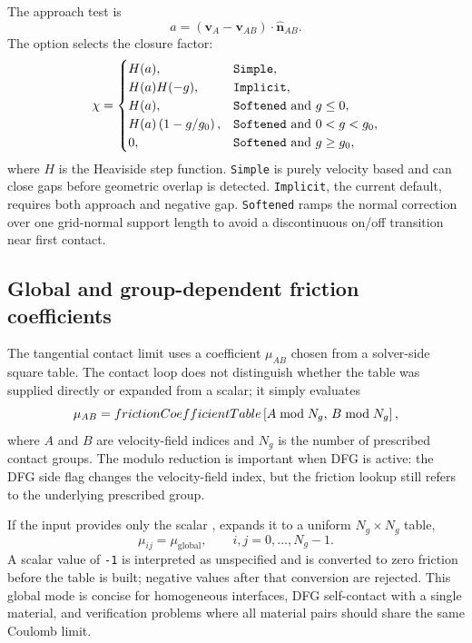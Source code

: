 The approach test is
\begin{equation}
  a=(\mathbf{v}_A-\mathbf{v}_{AB})\cdot\hat{\mathbf{n}}_{AB}.
\end{equation}
The  option selects the closure factor:
\begin{equation}
\chi =
\begin{cases}
  H(a), & \texttt{Simple},\\
  H(a)H(-g), & \texttt{Implicit},\\
  H(a), & \texttt{Softened}\ \hbox{and}\ g\le 0,\\
  H(a)\left(1-g/g_0\right), & \texttt{Softened}\ \hbox{and}\ 0<g<g_0,\\
  0, & \texttt{Softened}\ \hbox{and}\ g\ge g_0,
\end{cases}
\label{eq:contact-gap-closure-factor}
\end{equation}
where $H$ is the Heaviside step function.  \texttt{Simple} is purely velocity based and can close gaps before geometric overlap is detected.  \texttt{Implicit}, the current default, requires both approach and negative gap.  \texttt{Softened} ramps the normal correction over one grid-normal support length to avoid a discontinuous on/off transition near first contact.

\subsection{Global and group-dependent friction coefficients}
\label{subsec:contact-friction-coefficients}

The tangential contact limit uses a coefficient $\mu_{AB}$ chosen from a solver-side square table.  The contact loop does not distinguish whether the table was supplied directly or expanded from a scalar; it simply evaluates
\begin{equation}
  \mu_{AB}=frictionCoefficientTable
  \left[A\bmod N_g,\,B\bmod N_g\right],
  \label{eq:contact-friction-table-index}
\end{equation}
where $A$ and $B$ are velocity-field indices and $N_g$ is the number of prescribed contact groups.  The modulo reduction is important when DFG is active: the DFG side flag changes the velocity-field index, but the friction lookup still refers to the underlying prescribed group.

If the input provides only the scalar ,  expands it to a uniform $N_g\times N_g$ table,
\begin{equation}
  \mu_{ij}=\mu_{\mathrm{global}},\qquad i,j=0,\ldots,N_g-1.
\end{equation}
A scalar value of \texttt{-1} is interpreted as unspecified and is converted to zero friction before the table is built; negative values after that conversion are rejected.  This global mode is concise for homogeneous interfaces, DFG self-contact with a single material, and verification problems where all material pairs should share the same Coulomb limit.

